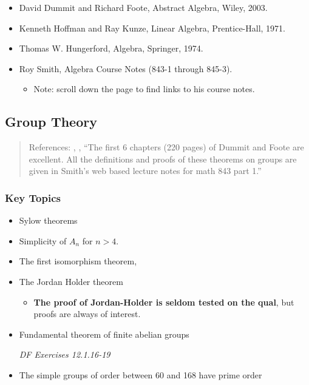 \begin{itemize}
\item
  David Dummit and Richard Foote, Abstract Algebra, Wiley, 2003.
  \autocite{dummit_foote_2004}
\item
  Kenneth Hoffman and Ray Kunze, Linear Algebra, Prentice-Hall, 1971.
  \autocite{hoffman_kunze_1981}
\item
  Thomas W. Hungerford, Algebra, Springer, 1974.
  \autocite{hungerford_2008}
\item
  Roy Smith, Algebra Course Notes (843-1 through 845-3).
  \autocite{smith}

  \begin{itemize}
  \tightlist
  \item
    Note: scroll down the page to find links to his course notes.
  \end{itemize}
\end{itemize}

\hypertarget{group-theory}{%
\subsection{Group Theory}\label{group-theory}}

\begin{quote}
References: \autocite{dummit_foote_2004}, \autocite{hungerford_2008},
\autocite{smith} ``The first 6 chapters (220 pages) of Dummit and Foote
are excellent. All the definitions and proofs of these theorems on
groups are given in Smith's web based lecture notes for math 843 part
1.''
\end{quote}

\hypertarget{key-topics}{%
\subsubsection{Key Topics}\label{key-topics}}

\begin{itemize}
\item
  Sylow theorems
\item
  Simplicity of \(A_n\) for \(n > 4\).
\item
  The first isomorphism theorem,
\item
  The Jordan Holder theorem

  \begin{itemize}
  \tightlist
  \item
    \textbf{The proof of Jordan-Holder is seldom tested on the qual},
    but proofs are always of interest.
  \end{itemize}
\item
  Fundamental theorem of finite abelian groups

  \emph{DF Exercises 12.1.16-19}
\item
  The simple groups of order between 60 and 168 have prime order
\end{itemize}

